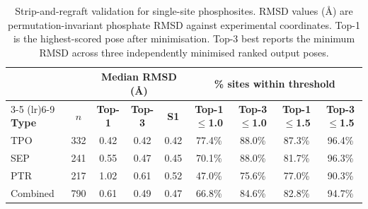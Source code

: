 \begin{table}[h!]
\caption{Strip-and-regraft validation for single-site phosphosites. RMSD values (\AA) are permutation-invariant phosphate RMSD against experimental coordinates. Top-1 is the highest-scored pose after minimisation. Top-3 best reports the minimum RMSD across three independently minimised ranked output poses.}
\label{tab:validation}
\centering
\small
\begin{tabularx}{\textwidth}{l c c c c c c c c}
\toprule
& & \multicolumn{3}{c}{\textbf{Median RMSD (\AA)}} & \multicolumn{4}{c}{\textbf{\% sites within threshold}} \\
\cmidrule(lr){3-5} \cmidrule(lr){6-9}
\textbf{Type} & \textbf{$n$} & \textbf{Top-1} & \textbf{Top-3} & \textbf{S1} & \textbf{Top-1 $\leq$1.0} & \textbf{Top-3 $\leq$1.0} & \textbf{Top-1 $\leq$1.5} & \textbf{Top-3 $\leq$1.5} \\
\midrule
TPO & 332 & 0.42 & 0.42 & 0.42 & 77.4\% & 88.0\% & 87.3\% & 96.4\% \\
SEP & 241 & 0.55 & 0.47 & 0.45 & 70.1\% & 88.0\% & 81.7\% & 96.3\% \\
PTR & 217 & 1.02 & 0.61 & 0.52 & 47.0\% & 75.6\% & 77.0\% & 90.3\% \\
\midrule
Combined & 790 & 0.61 & 0.49 & 0.47 & 66.8\% & 84.6\% & 82.8\% & 94.7\% \\
\bottomrule
\end{tabularx}
\end{table}
